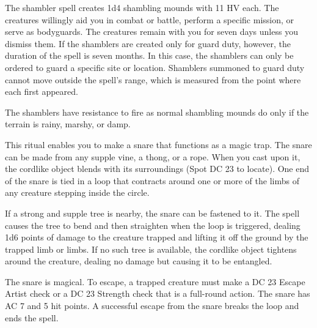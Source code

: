 \spellrng{\rngmed}
\begin{spelleffect}
The shambler spell creates 1d4 shambling mounds with 11 HV each. The creatures willingly aid you in combat or battle, perform a specific mission, or serve as bodyguards. The creatures remain with you for seven days unless you dismiss them. If the shamblers are created only for guard duty, however, the duration of the spell is seven months. In this case, the shamblers can only be ordered to guard a specific site or location. Shamblers summoned to guard duty cannot move outside the spell's range, which is measured from the point where each first appeared. 
\par The shamblers have resistance to fire as normal shambling mounds do only if the terrain is rainy, marshy, or damp.
\end{spelleffect}

\begin{spelleffect}
This ritual enables you to make a snare that functions as a magic trap. The snare can be made from any supple vine, a thong, or a rope. When you cast  upon it, the cordlike object blends with its surroundings (Spot DC 23 to locate). One end of the snare is tied in a loop that contracts around one or more of the limbs of any creature stepping inside the circle.
\par If a strong and supple tree is nearby, the snare can be fastened to it. The spell causes the tree to bend and then straighten when the loop is triggered, dealing 1d6 points of damage to the creature trapped and lifting it off the ground by the trapped limb or limbs. If no such tree is available, the cordlike object tightens around the creature, dealing no damage but causing it to be entangled.
\par The snare is magical. To escape, a trapped creature must make a DC 23 Escape Artist check or a DC 23 Strength check that is a full-round action. The snare has AC 7 and 5 hit points. A successful escape from the snare breaks the loop and ends the spell.
\end{spelleffect}

